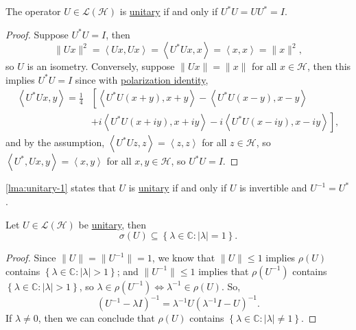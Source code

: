 \begin{lemma}\label{lma:unitary-1}
	The operator \(U\in \mathcal{L} (\mathcal{H} )\) is \hyperref[def:unitary-op]{unitary} if and only if \(U^{\ast} U = U U^{\ast} = I\).
\end{lemma}
\begin{proof}
	Suppose \(U^{\ast} U = I\), then
	\[
		\lVert Ux \rVert ^2
		= \left\langle Ux, Ux \right\rangle
		= \left\langle U^{\ast} Ux, x \right\rangle
		= \left\langle x, x \right\rangle
		= \lVert x \rVert ^2,
	\]
	so \(U\) is an isometry. Conversely, suppose \(\lVert Ux \rVert = \lVert x \rVert \) for all \(x\in \mathcal{H} \), then this implies \(U^{\ast} U = I\) since with \hyperref[lma:polarization-identity]{polarization identity},
	\[
		\begin{split}
			\left\langle U^{\ast} Ux, y \right\rangle
			= \frac{1}{4} &\left[ \left\langle U^{\ast} U(x+y), x+y \right\rangle - \left\langle U^{\ast} U(x-y), x-y \right\rangle \right.\\
				&+ \left. i\left\langle U^{\ast} U(x+iy), x+iy \right\rangle - i\left\langle U^{\ast} U(x-iy), x-iy \right\rangle \right],
		\end{split}
	\]
	and by the assumption, \(\left\langle U^{\ast} Uz, z \right\rangle = \left\langle z, z \right\rangle \) for all \(z\in \mathcal{H} \), so \(\left\langle U^{\ast} , Ux, y \right\rangle = \left\langle x, y \right\rangle \) for all \(x, y\in \mathcal{H} \), so \(U^{\ast} U = I\).
\end{proof}

\begin{remark}
	\autoref{lma:unitary-1} states that \(U\) is \hyperref[def:unitary-op]{unitary} if and only if \(U\) is invertible and \(U ^{-1} = U^{\ast}\).
\end{remark}

\begin{proposition}
	Let \(U\in \mathcal{L} (\mathcal{H} )\) be \hyperref[def:unitary-op]{unitary}, then
	\[
		\sigma (U) \subseteq \left\{ \lambda \in \mathbb{C} \colon \vert \lambda  \vert = 1 \right\}.
	\]
\end{proposition}
\begin{proof}
	Since \(\lVert U \rVert = \lVert U^{-1}  \rVert = 1\), we know that \(\lVert U \rVert \leq 1\) implies \(\rho (U)\) contains \(\left\{ \lambda \in \mathbb{C} \colon \vert \lambda \vert > 1 \right\} \); and \(\lVert U^{-1}  \rVert \leq 1\) implies that \(\rho (U^{-1} )\) contains \(\left\{ \lambda \in \mathbb{C} \colon \vert \lambda  \vert > 1 \right\} \), so \(\lambda \in \rho (U^{-1} ) \iff \lambda ^{-1} \in \rho (U)\). So,
	\[
		(U ^{-1}  - \lambda I)^{-1} = \lambda ^{-1} U(\lambda ^{-1} I- U)^{-1} .
	\]
	If \(\lambda \neq 0\), then we can conclude that \(\rho (U)\) contains \(\left\{ \lambda \in \mathbb{C} \colon \vert \lambda  \vert \neq 1 \right\} \).
\end{proof}

